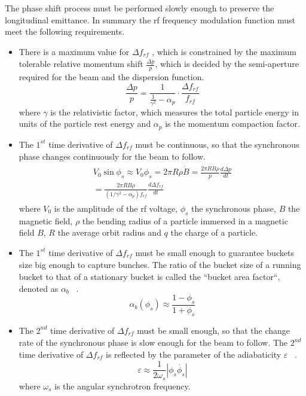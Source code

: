 The phase shift process must be performed slowly enough to preserve the longitudinal emittance. In summary the rf frequency modulation function must meet the following requirements.   
\begin{itemize}
	\item There is a maximum value for $\Delta f_\mathit{rf}$ , which is constrained by the maximum tolerable relative momentum shift $\frac{\Delta{p}}{p}$, which is decided by the semi-aperture required for the beam and the dispersion function. 
\begin{equation}
\frac{\Delta{p}}{p}  = \frac{1}{\frac{1}{\gamma^2}-\alpha_{\mathit{p}}}\cdot \frac{\Delta f_{\mathit{rf}}}{f_{\mathit{rf}}}
\label{eq:phaseP11}
\end{equation}
where $\gamma$ is the relativistic factor, which measures the total particle energy in units of the particle rest energy and $\alpha_{\mathit{p}}$ is the momentum compaction factor.

	\item The $1^\mathit{st}$ time derivative of $\Delta f_\mathit{rf}$ must be continuous, so that the synchronous phase changes continuously for the beam to follow. 
\begin{eqnarray}
\begin{aligned}
	V_0\sin\phi_s\approx V_0\phi_s=2\pi R\rho\dot{B}=\frac{2\pi R B\rho}{p} \frac{d \Delta p}{dt}\\=\frac{2\pi R B\rho}{(1/\gamma^2-\alpha_p)f_\mathit{rf}} \frac{d \Delta f_\mathit{rf}}{dt}
\end{aligned}
\end{eqnarray}
where $V_0$ is the amplitude of the rf voltage, $\phi_s$ the synchronous phase, $B$ the magnetic field, $\rho$ the bending radius of a particle immersed in a magnetic field $B$, $R$ the average orbit radius and $q$ the charge of a particle.
	\item The $1^\mathit{st}$ time derivative of $\Delta f_\mathit{rf}$ must be small enough to guarantee buckets size big enough to capture bunches. 
The ratio of the bucket size of a running bucket to that of a stationary bucket is called the ``bucket area factor``, denoted as $\alpha_b$ ~\cite{lee_accelerator_2011}.
\begin{equation} 
\label{bucket_size}
\alpha_b(\phi_{s})\approx \frac{1-\phi_{s}}{1+\phi_{s}}
\end{equation} 
	\item The $2^\mathit{nd}$ time derivative of $\Delta f_\mathit{rf}$ must be small enough, so that the change rate of the synchronous phase is slow enough for the beam to follow. The $2^\mathit{nd}$ time derivative of $\Delta f_\mathit{rf}$ is reflected by the parameter of the adiabaticity $\varepsilon$ ~\cite{ezura_beam-dynamics_2008}.
\begin{equation}
\varepsilon \approx \frac{1}{2\omega_s}|\phi_s\dot{\phi_{s}}|
\label{eq:derivation1}
\end{equation} 
where $\omega_s$ is the angular synchrotron frequency.
\end{itemize}


